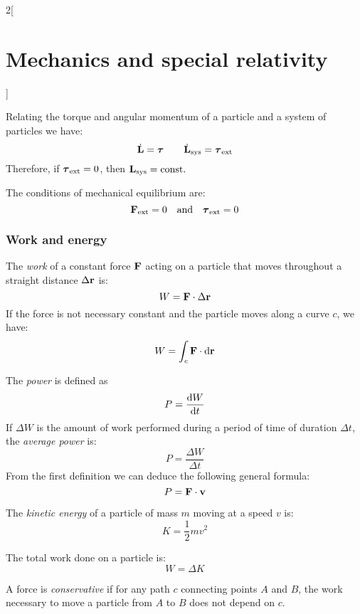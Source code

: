 \documentclass[../../../main.tex]{subfiles}
\begin{document}
\begin{multicols}{2}[\section{Mechanics and special relativity}]
\begin{prop}[Torque]
  \end{prop}
  \begin{prop}
    Relating the torque and angular momentum of a particle and a system of particles we have:
    $$\dot{\boldsymbol{\mathrm{L}}}=\vb*{\tau}\qquad\dot{\boldsymbol{\mathrm{L}}}_\text{sys}=\vb*{\tau}_\text{ext}$$ Therefore, if $\vb*{\tau}_\text{ext}=0$, then $\boldsymbol{\mathrm{L}}_\text{sys}=\text{const}.$
  \end{prop}
  \begin{definition}
    The conditions of mechanical equilibrium are: $$\boldsymbol{\mathrm{F}}_\text{ext}=0\quad\text{and}\quad\vb*{\tau}_\text{ext}=0$$
  \end{definition}
  \subsubsection{Work and energy}
  \begin{definition}[Work]
    The \textit{work} of a constant force $\boldsymbol{\mathrm{F}}$ acting on a particle that moves throughout a straight distance $\Delta\boldsymbol{\mathrm{r}}$ is: $$ W=\boldsymbol{\mathrm{F}}\cdot\Delta\boldsymbol{\mathrm{r}}$$ If the force is not necessary constant and the particle moves along a curve $c$, we have: $$W=\int_c\boldsymbol{\mathrm{F}}\cdot \dd\boldsymbol{\mathrm{r}}$$
  \end{definition}
  \begin{definition}[Power]
    The \textit{power} is defined as $$P=\dv{W}{t}$$ If $\Delta W$ is the amount of work performed during a period of time of duration $\Delta t$, the \textit{average power} is: $$P=\frac{\Delta W}{\Delta t}$$ From the first definition we can deduce the following general formula: $$P=\boldsymbol{\mathrm{F}}\cdot\boldsymbol{\mathrm{v}}$$
  \end{definition}
  \begin{definition}
    The \textit{kinetic energy} of a particle of mass $m$ moving at a speed $v$ is: $$K=\frac{1}{2}mv^2$$
  \end{definition}
  \begin{theorem}
    The total work done on a particle is:
    $$W=\Delta K$$
  \end{theorem}
  \begin{definition}
    A force is \textit{conservative} if for any path $c$ connecting points $A$ and $B$, the work necessary to move a particle from $A$ to $B$ does not depend on $c$.
  \end{definition}
  \begin{prop}

\end{prop}
\end{multicols}
\end{document}
